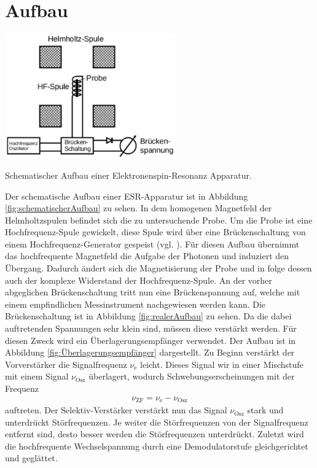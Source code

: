 \newpage
\section{Aufbau}
\label{sec:Durchführung}

\begin{floatingfigure}{0.55\textwidth}
  \includegraphics[width=0.55\textwidth]{picture/schematischerAufbau.pdf}
  \caption{Schematischer Aufbau einer Elektronenspin-Resonanz Apparatur. \cite{V28}}
  \label{fig:schematischerAufbau}
\end{floatingfigure}

Der schematische Aufbau einer ESR-Apparatur ist in Abbildung \eqref{fig:schematischerAufbau} zu sehen. In dem homogenen Magnetfeld der Helmholtzspulen befindet sich die zu untersuchende Probe. Um die Probe ist eine Hochfrequenz-Spule gewickelt, diese Spule wird über eine Brückenschaltung von einem Hochfrequenz-Generator gespeist (vgl. \cite[109]{V28}). Für diesen Aufbau übernimmt das hochfrequente Magnetfeld die Aufgabe der Photonen und induziert den Übergang. Dadurch ändert sich die Magnetisierung der Probe und in folge dessen auch der komplexe Widerstand der Hochfrequenz-Spule. An der vorher abgeglichen Brückenschaltung tritt nun eine Brückenspannung auf, welche mit einem empfindlichen Messinstrument nachgewiesen werden kann. Die Brückenschaltung ist in Abbildung \eqref{fig:realerAufbau} zu sehen. Da die dabei auftretenden Spannungen sehr klein sind, müssen diese verstärkt werden. Für diesen Zweck wird ein Überlagerungsempfänger verwendet. Der Aufbau ist in Abbildung \eqref{fig:Überlagerungsempfänger} dargestellt. Zu Beginn verstärkt der Vorverstärker die Signalfrequenz $\nu_\text{e}$ leicht. Dieses Signal wir in einer Mischstufe mit einem Signal $\nu_\text{Osz}$ überlagert, wodurch Schwebungserscheinungen mit der Frequenz
\begin{align}
  \nu_\text{ZF} = \nu_\text{e} - \nu_\text{Osz}
\end{align}
auftreten. Der Selektiv-Verstärker verstärkt nun das Signal $\nu_\text{Osz}$ stark und unterdrückt Störfrequenzen. Je weiter die Störfrequenzen von der Signalfrequenz entfernt sind, desto besser werden die Störfrequenzen unterdrückt. Zuletzt wird die hochfrequente Wechselspannung durch eine Demodulatorstufe gleichgerichtet und geglättet.

